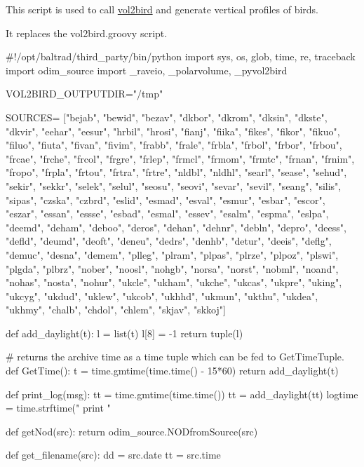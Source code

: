 This script is used to call \mbox{\hyperlink{structvol2bird}{vol2bird}} and generate vertical profiles of birds.

It replaces the vol2bird.\+groovy script.


\begin{DoxyCode}
#!/opt/baltrad/third\_party/bin/python
import sys, os, glob, time, re, traceback
import odim\_source
import \_raveio, \_polarvolume, \_pyvol2bird

VOL2BIRD\_OUTPUTDIR="/tmp"

SOURCES=  ["bejab", "bewid", "bezav", 
    "dkbor", "dkrom", "dksin", "dkste", "dkvir", 
    "eehar", "eesur",
    "hrbil", "hrosi",
    "fianj", "fiika", "fikes", "fikor", "fikuo",
    "filuo", "fiuta", "fivan", "fivim", 
    "frabb", "frale", "frbla", "frbol", "frbor", "frbou",
    "frcae", "frche", "frcol", "frgre", "frlep",
    "frmcl", "frmom", "frmtc", "frnan", "frnim",
    "fropo", "frpla", "frtou", "frtra", "frtre",
    "nldbl", "nldhl", 
    "searl", "sease", "sehud", "sekir", "sekkr", "selek",
    "selul", "seosu", "seovi", "sevar", "sevil", "seang",
    "silis", "sipas",
    "czska", "czbrd",
    "eslid", "esmad", "esval", "esmur", "esbar", "escor",
    "eszar", "essan", "essse", "esbad", "esmal", "essev",
    "esalm", "espma", "eslpa",
    "deemd", "deham", "deboo", "deros", "dehan", "dehnr", 
    "debln", "depro", "deess", "defld", "deumd", "deoft",
    "deneu", "dedrs", "denhb", "detur", "deeis", "deflg",
    "demuc", "desna", "demem",
    "plleg", "plram", "plpas", "plrze", "plpoz", "plswi",
    "plgda", "plbrz",
    "nober", "noosl", "nohgb", "norsa", "norst", "nobml",
    "noand", "nohas", "nosta", "nohur", 
    "ukcle", "ukham", "ukche", "ukcas", "ukpre", "uking",
    "ukcyg", "ukdud", "uklew", "ukcob", "ukhhd", "ukmun",
    "ukthu", "ukdea", "ukhmy", 
    "chalb", "chdol", "chlem",
    "skjav", "skkoj"]

def add\_daylight(t):
    l = list(t)
    l[8] = -1
    return tuple(l)

# returns the archive time as a time tuple which can be fed to GetTimeTuple.
def GetTime():
  t = time.gmtime(time.time() - 15*60)
  return add\_daylight(t)

def print\_log(msg):
  tt = time.gmtime(time.time())
  tt = add\_daylight(tt)
  logtime = time.strftime("%
  print "%

def getNod(src):
    return odim\_source.NODfromSource(src)

def get\_filename(src):
  dd = src.date
  tt = src.time


\end{DoxyCode}

